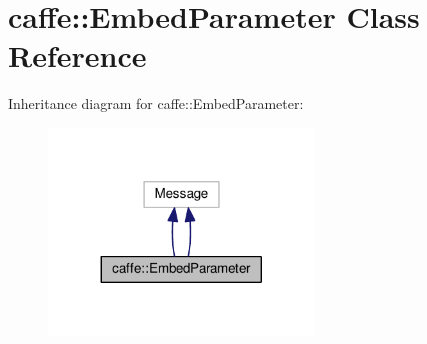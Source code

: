 \hypertarget{classcaffe_1_1_embed_parameter}{}\section{caffe\+:\+:Embed\+Parameter Class Reference}
\label{classcaffe_1_1_embed_parameter}


Inheritance diagram for caffe\+:\+:Embed\+Parameter\+:
\nopagebreak
\begin{figure}[H]
\begin{center}
\leavevmode
\includegraphics[width=200pt]{classcaffe_1_1_embed_parameter__inherit__graph}
\end{center}
\end{figure}
